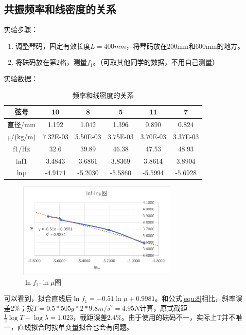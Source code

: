 \documentclass[11pt]{article}
\begin{document}
\subsection{共振频率和线密度的关系}
\noindent 实验步骤：
\begin{enumerate}
    \item 调整琴码，固定有效长度$L=400mm$，将琴码放在200mm和600mm的地方。
    \item 将砝码放在第2格，测量$f_1$。（可取其他同学的数据，不用自己测量）
\end{enumerate}
\noindent 实验数据：
\begin{table}[H]
    \centering
    \caption{频率和线密度的关系}
    \begin{tabular}{|c|c|c|c|c|c|}
    \hline
        弦号 & 10 & 8 & 5 & 11 & 7 \\ \hline
        直径/mm & 1.192  & 1.042  & 1.396  & 0.890  & 0.824  \\ \hline
        μ/(kg/m) & 7.32E-03 & 5.50E-03 & 3.75E-03 & 3.70E-03 & 3.37E-03 \\ \hline
        f1/Hz & 32.6 & 39.89 & 46.38 & 47.53 & 48.93 \\ \hline
        lnf1 & 3.4843  & 3.6861  & 3.8369  & 3.8614  & 3.8904  \\ \hline
        lnμ & -4.9171  & -5.2030  & -5.5860  & -5.5994  & -5.6928 \\ \hline
    \end{tabular}
\end{table}
\begin{figure}[H]
    \centering
    \includegraphics[width=8cm]{Fig/5.png}
    \caption{$\ln f_1$-$\ln \mu$图}
\end{figure}
\par 可以看到，拟合直线后$\ln f_1=-0.51\ln \mu+0.9981$。和公式\eqref{equ:8}相比，斜率误差$2\%$；按$T=0.5*505g*2*9.8m/s^2=4.95N$计算，原式截距$\frac{1}{2}\log T-\log \lambda=1.023$，截距误差$2.4\%$。由于使用的砝码不一，实际上T并不唯一，直线拟合时按单变量拟合也会有问题。
\end{document}
